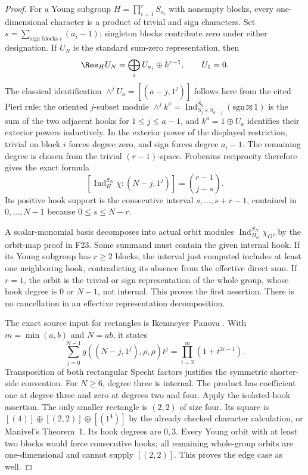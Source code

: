 \documentclass[11pt,a4paper]{article}
\newcommand{\fid}[1]{\textsf{#1}}\newcommand{\gate}[1]{\textsf{#1}}
\theoremstyle{named}\newtheorem{finding}{Finding}[section]
\theoremstyle{definition}\newtheorem{definition}[finding]{Definition}
\theoremstyle{remark}\newtheorem{remark}[finding]{Remark}
\begin{document}
\begin{proof}
For a Young subgroup $H=\prod_{i=1}^r S_{a_i}$ with nonempty blocks,
every one-dimensional character is a product of trivial and sign
characters. Set $s=\sum_{\text{sign blocks }i}(a_i-1)$; singleton
blocks contribute zero under either designation. If $U_N$ is the
standard sum-zero representation, then
\[
 \Res_H U_N=\bigoplus_i U_{a_i}\oplus k^{r-1},\qquad U_1=0.
\]
The classical identification $\wedge^jU_a=[(a-j,1^j)]$ follows here
from the cited Pieri rule: the oriented $j$-subset module
$\wedge^j k^a=\operatorname{Ind}_{S_j\times S_{a-j}}^{S_a}
(\mathrm{sgn}\boxtimes1)$ is the sum of the two adjacent hooks for $1\le j\le a-1$,
and $k^a=1\oplus U_a$ identifies their exterior powers inductively.
In the exterior power of the displayed restriction, trivial on block
$i$ forces degree zero, and sign forces degree $a_i-1$. The remaining
degree is chosen from the trivial $(r-1)$-space. Frobenius reciprocity
therefore gives the exact formula
\[
 [\operatorname{Ind}_H^{S_N}\chi:(N-j,1^j)]
       =\binom{r-1}{j-s}.
\]
Its positive hook support is the consecutive interval
$s,\ldots,s+r-1$, contained in $0,\ldots,N-1$ because
$0\le s\le N-r$.

A scalar-monomial basis decomposes into actual orbit modules
$\operatorname{Ind}_{H_O}^{S_N}\chi_O$, by the orbit-map proof in
\fid{F23}. Some summand must contain the given internal hook. If its
Young subgroup has $r\ge2$ blocks, the interval just computed includes
at least one neighboring hook, contradicting its absence from the
effective direct sum. If $r=1$, the orbit is the trivial or sign
representation of the whole group, whose hook degree is $0$ or
$N-1$, not internal. This proves the first assertion. There is no
cancellation in an effective representation decomposition.

The exact source input for rectangles is Ikenmeyer--Panova
\cite[Proposition~6.4, pp.~15--16]{IP}. With $m=\min(a,b)$ and $N=ab$,
it states
\begin{equation}\label{eq:recthookproduct}
 \sum_{j=0}^{N-1}g((N-j,1^j),\rho,\rho)t^j
       =\prod_{i=2}^{m}(1+t^{2i-1}).
\end{equation}
Transposition of both rectangular Specht factors justifies the
symmetric shorter-side convention. For $N\ge6$, degree three is
internal. The product has coefficient one at degree three and zero
at degrees two and four. Apply the isolated-hook assertion.
The only smaller rectangle is $(2,2)$ of size four. Its square is
$[(4)]\oplus[(2,2)]\oplus[(1^4)]$ by the already checked character
calculation, or Manivel's Theorem~1. Its hook degrees are $0,3$.
Every Young orbit with at least two blocks would force consecutive
hooks; all remaining whole-group orbits are one-dimensional and
cannot supply $[(2,2)]$. This proves the edge case as well.
\end{proof}
\end{document}
